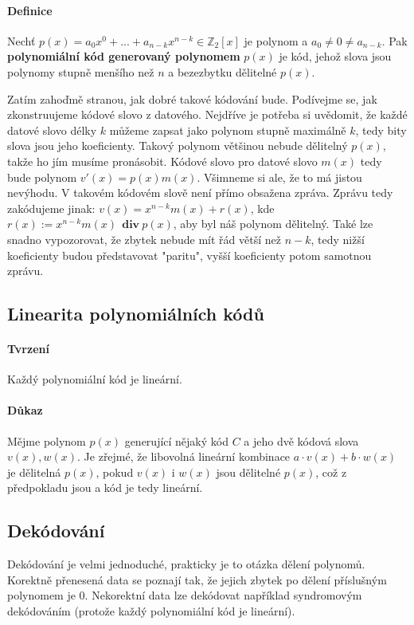 \documentclass[a4paper,12pt]{article}
\newcommand{\Z}{\mathbb{Z}}
\renewcommand{\div}{\ \ \mathbf{div}\ }
\begin{document}
\paragraph{Definice}
Nechť $p(x) = a_0 x^0 + ... + a_{n-k}x^{n-k} \in \Z_2[x]$ je polynom a $a_0 \neq 
0 \neq a_{n-k}$. Pak \textbf{polynomiální kód generovaný polynomem} $p(x)$ je 
kód, jehož slova jsou polynomy stupně menšího než $n$ a bezezbytku dělitelné 
$p(x)$.

Zatím zahoďmě stranou, jak dobré takové kódování bude. Podívejme se, jak 
zkonstruujeme kódové slovo z datového. Nejdříve je potřeba si uvědomit, že každé 
datové slovo délky $k$ můžeme zapsat jako polynom stupně maximálně $k$, tedy 
bity slova jsou jeho koeficienty. Takový polynom většinou nebude dělitelný 
$p(x)$, takže ho jím musíme pronásobit. Kódové slovo pro datové slovo $m(x)$ 
tedy bude polynom $v'(x) = p(x)m(x)$. Všimneme si ale, že to má jistou nevýhodu.  
V takovém kódovém slově není přímo obsažena zpráva. Zprávu tedy zakódujeme 
jinak: $v(x) = x^{n-k}m(x) + r(x)$, kde $r(x) := x^{n-k}m(x) \div p(x)$, aby byl 
náš polynom dělitelný. Také lze snadno vypozorovat, že zbytek nebude mít řád 
větší než $n-k$, tedy nižší koeficienty budou představovat "paritu", vyšší 
koeficienty potom samotnou zprávu.

\subsection{Linearita polynomiálních kódů}
\paragraph{Tvrzení}
Každý polynomiální kód je lineární.
\paragraph{Důkaz}
Mějme polynom $p(x)$ generující nějaký kód $C$ a jeho dvě kódová slova $v(x), 
w(x)$. Je zřejmé, že libovolná lineární kombinace $a \cdot v(x) + b\cdot w(x)$ 
je dělitelná $p(x)$, pokud $v(x)$ i $w(x)$ jsou dělitelné $p(x)$, což z 
předpokladu jsou a kód je tedy lineární.

\subsection{Dekódování}
Dekódování je velmi jednoduché, prakticky je to otázka dělení polynomů. Korektně 
přenesená data se poznají tak, že jejich zbytek po dělení příslušným polynomem 
je $0$. Nekorektní data lze dekódovat například syndromovým dekódováním (protože 
každý polynomiální kód je lineární).
\end{document}

